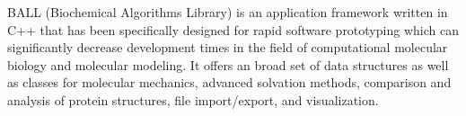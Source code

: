 BALL (Biochemical Algorithms Library) is an application framework written in C++ that has been specifically designed for rapid software prototyping which can significantly decrease development times in the field of computational molecular biology and molecular modeling. It offers an broad set of data structures as well as classes for molecular mechanics, advanced solvation methods, comparison and analysis of protein structures, file import/export, and visualization.